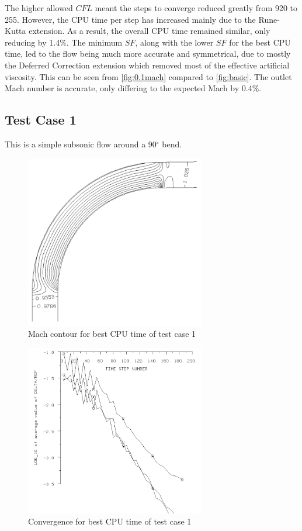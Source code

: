\documentclass[12pt, a4paper]{article}
\begin{document}
The higher allowed $CFL$ meant the steps to converge reduced greatly from 920 to 255. However, the CPU time per step has increased mainly due to the Rune-Kutta extension. As a result, the overall CPU time remained similar, only reducing by 1.4\%. The minimum $SF$, along with the lower $SF$ for the best CPU time, led to the flow being much more accurate and symmetrical, due to mostly the Deferred Correction extension which removed most of the effective artificial viscosity. This can be seen from \autoref{fig:0.1mach} compared to \autoref{fig:basic}. The outlet Mach number is accurate, only differing to the expected Mach by 0.4\%.

\subsection{Test Case 1}
This is a simple subsonic flow around a 90$^{\circ}$ bend. 
\begin{figure}[H]
	\centering
	\includegraphics[width=0.7\textwidth]{plots/1.2 mach}
	\caption{Mach contour for best CPU time of test case 1}
	\label{fig:1.2mach}
\end{figure}
\begin{figure}[H]
	\centering
	\includegraphics[width=0.7\textwidth]{plots/1.2 conv}
	\caption{Convergence for  best CPU time of test case 1}
	\label{fig:1.2conv}
\end{figure}
\end{document}
